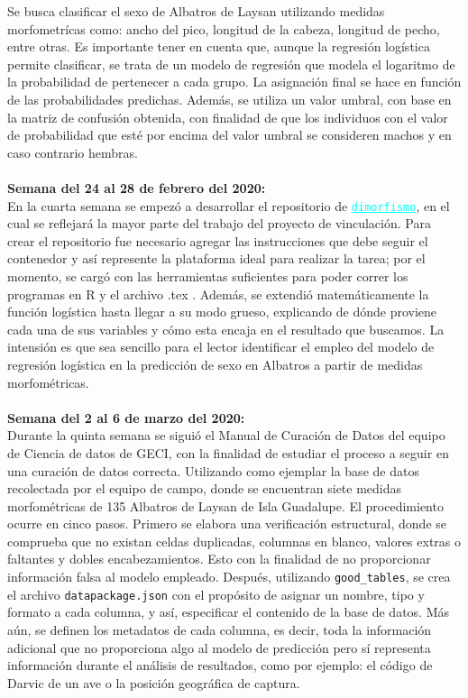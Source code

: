\documentclass{article}
\begin{document}
   Se busca clasificar el sexo de Albatros de Laysan utilizando medidas morfometrícas como: ancho del pico, longitud de la cabeza, longitud de pecho, entre otras. Es importante tener en cuenta que, aunque la regresión logística permite clasificar, se trata de un modelo de regresión que modela el logaritmo de la probabilidad de pertenecer a cada grupo. La asignación final se hace en función de las probabilidades predichas. Además, se utiliza un valor umbral, con base en la matriz de confusión obtenida, con finalidad de que los individuos con el valor de probabilidad que esté por encima del valor umbral se consideren machos y en caso contrario hembras.
\\ \\
    \textbf{Semana del 24 al 28 de febrero del 2020:} \\
    En la cuarta semana se empezó a desarrollar el repositorio de \href{https://github.com/IslasGECI/dimorfismo}{\textcolor{cyan}{\underline{\texttt{dimorfismo}}}}, en el cual se reflejará la mayor parte del trabajo del proyecto de vinculación. Para crear el repositorio fue necesario agregar las instrucciones que debe seguir el contenedor y así represente la plataforma ideal para realizar la tarea; por el momento, se cargó con las herramientas suficientes para poder correr los programas en R y el archivo .tex .
    Además, se extendió matemáticamente la función logística hasta llegar a su modo grueso, explicando de dónde proviene cada una de sus variables y cómo esta encaja en el resultado que buscamos. La intensión es que sea sencillo para el lector identificar el empleo del modelo de regresión logística en la predicción de sexo en Albatros a partir de medidas morfométricas. 
    \\ \\
    \textbf{Semana del 2 al 6 de marzo del 2020:} \\
    Durante la quinta semana se siguió el Manual de Curación de Datos del equipo de Ciencia de datos de GECI, con la finalidad de estudiar el proceso a seguir en una curación de datos correcta. Utilizando como ejemplar la base de datos recolectada por el equipo de campo, donde se encuentran siete medidas morfométricas de 135 Albatros de Laysan de Isla Guadalupe.
    El procedimiento ocurre en cinco pasos. Primero se elabora una verificación estructural, donde se comprueba que no existan celdas duplicadas, columnas en blanco, valores extras o faltantes y dobles encabezamientos. Esto con la finalidad de no proporcionar información falsa al modelo empleado. 
    Después, utilizando \texttt{good\_tables}, se crea el archivo \texttt{datapackage.json} con el propósito de asignar un nombre, tipo y formato a cada columna, y así, especificar el contenido de la base de datos. Más aún, se definen los metadatos de cada columna, es decir, toda la información adicional que no proporciona algo al modelo de predicción pero sí representa información durante el análisis de resultados, como por ejemplo: el código de Darvic de un ave o la posición geográfica de captura.
\end{document}
